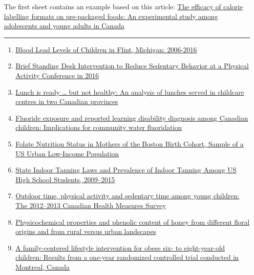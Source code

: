 \documentclass[]{book}
\providecommand{\tightlist}{%
  \setlength{\itemsep}{0pt}\setlength{\parskip}{0pt}}
\providecommand{\tightlist}{%
  \setlength{\itemsep}{0pt}\setlength{\parskip}{0pt}}
\theoremstyle{definition}
\theoremstyle{definition}
\theoremstyle{definition}
\theoremstyle{remark}
\begin{document}
The first sheet contains an example based on this article:
\href{https://www.dropbox.com/s/hg5wk5ea2bg5t5o/CalorieLabellingPackagesFoods.pdf?dl=1}{The
efficacy of calorie labelling formats on pre-packaged foods: An
experimental study among adolescents and young adults in Canada}

\begin{center}\rule{0.5\linewidth}{\linethickness}\end{center}

\begin{enumerate}
\def\labelenumi{\arabic{enumi}.}
\tightlist
\item
  \href{https://www.dropbox.com/s/m8up4gyzyj5ll4z/BloodLeadLevelsFlint20062016.pdf?dl=1}{Blood
  Lead Levels of Children in Flint, Michigan: 2006-2016}
\item
  \href{https://www.dropbox.com/s/xzlyb8ugbp32maz/BriefStandingDeskIntervention.pdf?dl=1}{Brief
  Standing Desk Intervention to Reduce Sedentary Behavior at a Physical
  Activity Conference in 2016}
\item
  \href{https://www.dropbox.com/s/6hi90dr47wqczph/ContentOfChilCareCentreLunches.pdf?dl=1}{Lunch
  is ready \ldots{} but not healthy: An analysis of lunches served in
  childcare centres in two Canadian provinces}
\item
  \href{https://www.dropbox.com/s/i2gegxdqyzdzhe9/FluorideLearningDisability.pdf?dl=1}{Fluoride
  exposure and reported learning disability diagnosis among Canadian
  children: Implications for community water fluoridation}
\item
  \href{https://www.dropbox.com/s/oudh0hxb51ypekk/FolateStatusMothersBostonBirthCohort.pdf?dl=1}{Folate
  Nutrition Status in Mothers of the Boston Birth Cohort, Sample of a US
  Urban Low-Income Population}
\item
  \href{https://www.dropbox.com/s/3p2y7pwltda6age/IndoorTanningUSHighSchoolStudents.pdf?dl=1}{State
  Indoor Tanning Laws and Prevalence of Indoor Tanning Among US High
  School Students, 2009--2015}
\item
  \href{https://www.dropbox.com/s/6lvyh0c7go0ix2i/OutdoorTimePhySActivityKids.pdf?dl=1}{Outdoor
  time, physical activity and sedentary time among young children: The
  2012--2013 Canadian Health Measures Survey}
\item
  \href{https://www.dropbox.com/s/vz13rhygidw131d/PropertiesDifferenHoneys.pdf?dl=1}{Physicochemical
  properties and phenolic content of honey from different floral origins
  and from rural versus urban landscapes}
\item
  \href{https://www.dropbox.com/s/lmvrcgs80uqncf3/RCTlifestyleInterventionObeseKids.pdf?dl=1}{A
  family-centered lifestyle intervention for obese six- to
  eight-year-old children: Results from a one-year randomized controlled
  trial conducted in Montreal, Canada}
\end{enumerate}
\end{document}
